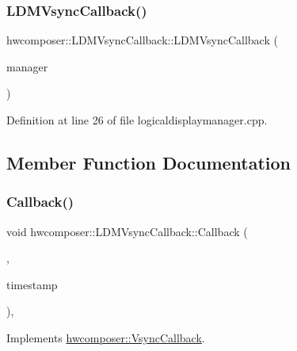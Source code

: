 \subsubsection{\texorpdfstring{L\+D\+M\+Vsync\+Callback()}{LDMVsyncCallback()}}
{\footnotesize\ttfamily hwcomposer\+::\+L\+D\+M\+Vsync\+Callback\+::\+L\+D\+M\+Vsync\+Callback (\begin{DoxyParamCaption}\item[{\mbox{\hyperlink{classhwcomposer_1_1LogicalDisplayManager}{Logical\+Display\+Manager}} $\ast$}]{manager }\end{DoxyParamCaption})\hspace{0.3cm}{\ttfamily [inline]}}



Definition at line 26 of file logicaldisplaymanager.\+cpp.


\begin{DoxyCode}{0}
\end{DoxyCode}


\subsection{Member Function Documentation}
\mbox{\label{classhwcomposer_1_1LDMVsyncCallback_ae92d66fdf645fa105ac163e33e5e6526}} 
\subsubsection{\texorpdfstring{Callback()}{Callback()}}
{\footnotesize\ttfamily void hwcomposer\+::\+L\+D\+M\+Vsync\+Callback\+::\+Callback (\begin{DoxyParamCaption}\item[{uint32\+\_\+t}]{,  }\item[{int64\+\_\+t}]{timestamp }\end{DoxyParamCaption})\hspace{0.3cm}{\ttfamily [inline]}, {\ttfamily [virtual]}}



Implements \mbox{\hyperlink{classhwcomposer_1_1VsyncCallback_a632ac6a2e13e1b387df9508507a2ed4d}{hwcomposer\+::\+Vsync\+Callback}}.



